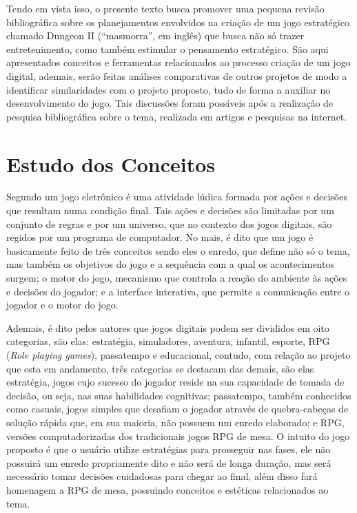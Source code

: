 \documentclass[12pt]{article}
\begin{document}
Tendo em vista isso, o presente texto busca promover uma pequena revisão bibliográfica sobre os planejamentos envolvidos na criação de um jogo estratégico chamado Dungeon II (“masmorra”, em inglês) que busca não só trazer entretenimento, como também estimular o pensamento estratégico. São aqui apresentados conceitos e ferramentas relacionados ao processo criação de um jogo digital, ademais, serão feitas análises comparativas de outros projetos de modo a identificar similaridades com o projeto proposto, tudo de forma a auxiliar no desenvolvimento do jogo. Tais discussões foram possíveis após a realização de pesquisa bibliográfica sobre o tema, realizada em artigos e pesquisas na internet.


\section{Estudo dos Conceitos}

Segundo \cite{lucchese2009conceituaccao} um jogo eletrônico é uma atividade lúdica formada por ações e decisões que resultam numa condição final. Tais ações e decisões são limitadas por um conjunto de regras e por um universo, que no contexto dos jogos digitais, são regidos por um programa de computador. No mais, é dito que um jogo é basicamente feito de três conceitos sendo eles o enredo, que define não só o tema, mas também os objetivos do jogo e a sequência com a qual os acontecimentos surgem; o motor do jogo, mecanismo que controla a reação do ambiente às ações e decisões do jogador; e a interface interativa, que permite a comunicação entre o jogador e o motor do jogo.

Ademais, é dito pelos autores que jogos digitais podem ser divididos em oito categorias, são elas: estratégia, simuladores, aventura, infantil, esporte, RPG (\emph{Role playing games}), passatempo e educacional, contudo, com relação ao projeto que esta em andamento, três categorias se destacam das demais, são elas estratégia, jogos cujo sucesso do jogador reside na sua capacidade de tomada de decisão, ou seja, nas suas habilidades cognitivas; passatempo, também conhecidos como casuais, jogos simples que desafiam o jogador através de quebra-cabeças de solução rápida que, em sua maioria, não possuem um enredo elaborado; e RPG, versões computadorizadas dos tradicionais jogos RPG de mesa. O intuito do jogo proposto é que o usuário utilize estratégias para prosseguir nas fases, ele não possuirá um enredo propriamente dito e não será de longa duração, mas será necessário tomar decisões cuidadosas para chegar ao final, além disso fará homenagem a RPG de mesa, possuindo conceitos e estéticas relacionados ao tema.
\end{document}
